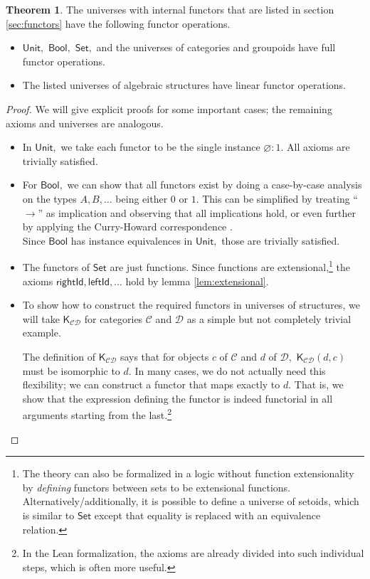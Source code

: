\documentclass[a4paper]{article}
\theoremstyle{definition}
\newtheorem{theorem}[definition]{Theorem}
\theoremstyle{remark}
\renewcommand{\emptyset}{\varnothing}
\newcommand{\C}{\mathcal{C}}
\newcommand{\D}{\mathcal{D}}
\newcommand{\nm}{\mathsf}
\newcommand{\universe}{\nm}
\newcommand{\Unit}{\universe{Unit}}
\newcommand{\Bool}{\universe{Bool}}
\newcommand{\Set}{\universe{Set}}
\newcommand{\combinator}{\nm}
\newcommand{\constFun}{\combinator{K}}
\begin{document}
\begin{theorem}
  \label{thm:funop}
  The universes with internal functors that are listed in section \ref{sec:functors} have the
  following functor operations.
  \begin{itemize}
    \item $\Unit,$ $\Bool,$ $\Set,$ and the universes of categories and groupoids have
    full functor operations.
    \item The listed universes of algebraic structures have linear functor operations.
  \end{itemize}
\end{theorem}

\begin{proof}
  We will give explicit proofs for some important cases; the remaining axioms and
  universes are analogous.
  \begin{itemize}
    \item In $\Unit,$ we take each functor to be the single instance $\emptyset : 1.$
    All axioms are trivially satisfied.
    \item For $\Bool,$ we can show that all functors exist by doing a case-by-case
    analysis on the types $A,B,\ldots$ being either $0$ or $1.$ This can be simplified by
    treating ``$\to$'' as implication and observing that all implications hold, or even
    further by applying the Curry-Howard correspondence \cite{curry-howard}.\\
    Since $\Bool$ has instance equivalences in $\Unit,$ those are trivially satisfied.
    \item The functors of $\Set$ are just functions. Since functions are
    extensional,\footnote{The theory can also be formalized in a logic without function
    extensionality by \emph{defining} functors between sets to be extensional functions.
    Alternatively/additionally, it is possible to define a universe of setoids, which
    is similar to $\Set$ except that equality is replaced with an equivalence relation.}
    the axioms $\nm{rightId},\nm{leftId},\ldots$ hold by lemma \ref{lem:extensional}.
    \item To show how to construct the required functors in universes of
    structures, we will take $\constFun_{\C\D}$ for categories $\C$ and $\D$ as a
    simple but not completely trivial example.

    The definition of $\constFun_{\C\D}$ says that for objects $c$ of $\C$ and $d$ of
    $\D,$ $\constFun_{\C\D}(d,c)$ must be isomorphic to $d.$ In many cases, we do not
    actually need this flexibility; we can construct a functor that maps exactly to
    $d.$ That is, we show that the expression defining the functor is indeed functorial
    in all arguments starting from the last.\footnote{In the Lean formalization, the
    axioms are already divided into such individual steps, which is often more useful.}


\end{itemize}
\end{proof}
\end{document}
